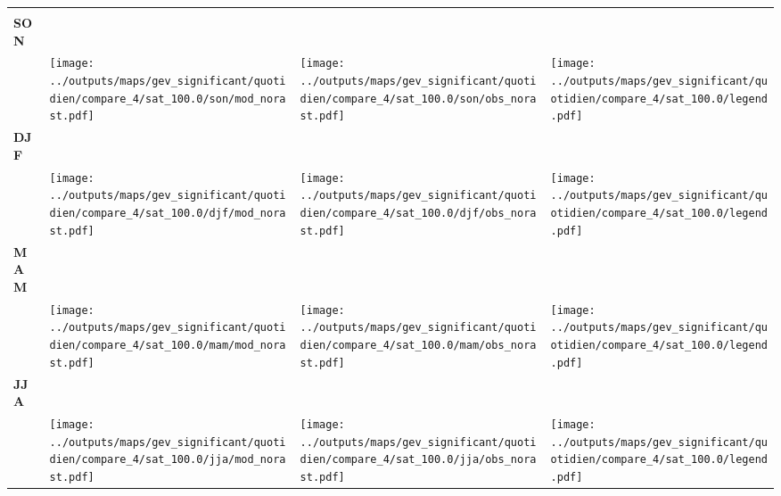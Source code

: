 \documentclass[
  letterpaper,
  DIV=11,
  numbers=noendperiod]{scrartcl}
\begin{document}
\begin{longtable*}{m{2.0cm}m{7.9cm}m{7.9cm}m{1cm}}
 & \centering  & \centering  & \tabularnewline
\centering \textbf{SON} \\[0.2em] \begin{tabular}{r@{\hspace{0.2em}}l}\end{tabular} & \centering \texttt{[image: ../outputs/maps/gev\_significant/quotidien/compare\_4/sat\_100.0/son/mod\_norast.pdf]} & \centering \texttt{[image: ../outputs/maps/gev\_significant/quotidien/compare\_4/sat\_100.0/son/obs\_norast.pdf]} & \centering \texttt{[image: ../outputs/maps/gev\_significant/quotidien/compare\_4/sat\_100.0/legend.pdf]} \tabularnewline
\centering \textbf{DJF} \\[0.2em] \begin{tabular}{r@{\hspace{0.2em}}l}\end{tabular} & \centering \texttt{[image: ../outputs/maps/gev\_significant/quotidien/compare\_4/sat\_100.0/djf/mod\_norast.pdf]} & \centering \texttt{[image: ../outputs/maps/gev\_significant/quotidien/compare\_4/sat\_100.0/djf/obs\_norast.pdf]} & \centering \texttt{[image: ../outputs/maps/gev\_significant/quotidien/compare\_4/sat\_100.0/legend.pdf]} \tabularnewline
\centering \textbf{MAM} \\[0.2em] \begin{tabular}{r@{\hspace{0.2em}}l}\end{tabular} & \centering \texttt{[image: ../outputs/maps/gev\_significant/quotidien/compare\_4/sat\_100.0/mam/mod\_norast.pdf]} & \centering \texttt{[image: ../outputs/maps/gev\_significant/quotidien/compare\_4/sat\_100.0/mam/obs\_norast.pdf]} & \centering \texttt{[image: ../outputs/maps/gev\_significant/quotidien/compare\_4/sat\_100.0/legend.pdf]} \tabularnewline
\centering \textbf{JJA} \\[0.2em] \begin{tabular}{r@{\hspace{0.2em}}l}\end{tabular} & \centering \texttt{[image: ../outputs/maps/gev\_significant/quotidien/compare\_4/sat\_100.0/jja/mod\_norast.pdf]} & \centering \texttt{[image: ../outputs/maps/gev\_significant/quotidien/compare\_4/sat\_100.0/jja/obs\_norast.pdf]} & \centering \texttt{[image: ../outputs/maps/gev\_significant/quotidien/compare\_4/sat\_100.0/legend.pdf]} \tabularnewline
\end{longtable*}
\end{document}
